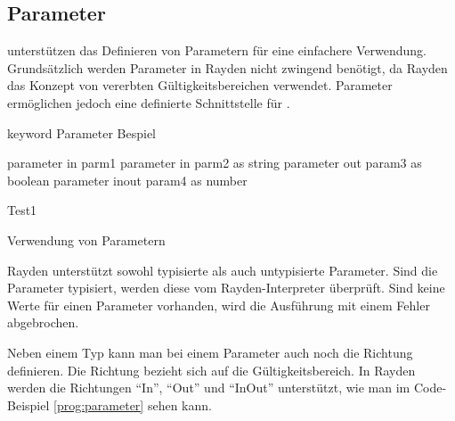 
\subsection{Parameter}
\label{cha:Parameter}

 unterstützen das Definieren von Parametern für eine einfachere Verwendung. Grundsätzlich werden Parameter in Rayden nicht zwingend benötigt, da Rayden das Konzept von vererbten Gültigkeitsbereichen verwendet. Parameter ermöglichen jedoch eine definierte Schnittstelle für . 

\begin{program}
\begin{JavaCode}
keyword Parameter Bespiel {
	
	parameter in    parm1
	parameter in    parm2 as string
	parameter out   param3 as boolean
	parameter inout param4 as number
	
	Test1	
}
\end{JavaCode}
\caption{Verwendung von Parametern}
\label{prog:parameter}
\end{program}


\SuperPar
Rayden unterstützt sowohl typisierte als auch untypisierte Parameter. Sind die Parameter typisiert, werden diese vom Rayden-Interpreter überprüft. Sind keine Werte für einen Parameter vorhanden, wird die Ausführung mit einem Fehler abgebrochen. 

\SuperPar
Neben einem Typ kann man bei einem Parameter auch noch die Richtung definieren. Die Richtung bezieht sich auf die Gültigkeitsbereich. In Rayden werden die Richtungen "`In"', "`Out"' und "`InOut"' unterstützt, wie man im Code-Beispiel \ref{prog:parameter} sehen kann. \\

